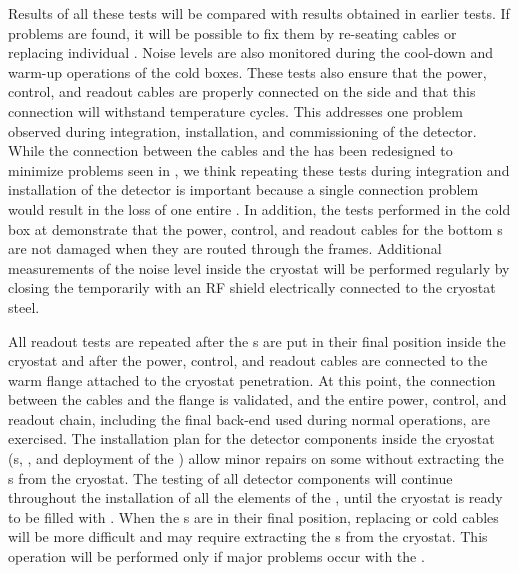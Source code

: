 Results of all these tests will be compared with results obtained 
in earlier  tests.  If problems are found, it will be possible 
to fix them by re-seating cables or replacing individual .
Noise levels are also monitored during the cool-down and warm-up 
operations of the cold boxes. These tests also ensure that the power, control, and readout cables are properly connected
on the  side and that this connection will withstand temperature 
cycles. This addresses one problem observed during integration,
installation, and commissioning of the  
detector. While the connection between the cables and the 
has been redesigned to minimize problems seen in ,
we think repeating these tests during integration
and installation of the detector is important because a single connection problem would
result in the loss of one entire . In addition, the tests 
performed in the cold box at  demonstrate that the power, control, and
readout cables for the bottom s are not damaged when they are routed 
through the  frames. Additional measurements of the noise
level inside the cryostat will be performed regularly by closing 
the  temporarily with an RF shield electrically connected 
to the cryostat steel. 

All readout tests are repeated after the s are put
in their final position inside the cryostat and after the power, control, and
readout cables are connected to the warm flange attached to the cryostat
penetration. At this point, the connection between the cables and the flange
is validated, and the entire power, control, and readout chain, including the
final  back-end used during normal operations, are exercised. The
installation plan for the detector components inside the cryostat (s,
, and deployment of the ) allow minor repairs on some  without extracting
the s from the cryostat. The testing of all detector components
will continue throughout the installation of all the elements of the , 
until the cryostat is ready to be filled with .  When the 
s are in their final position, replacing  
or cold cables will be more difficult and may require extracting the s 
from the cryostat. This operation will be performed only if major problems occur with the .

